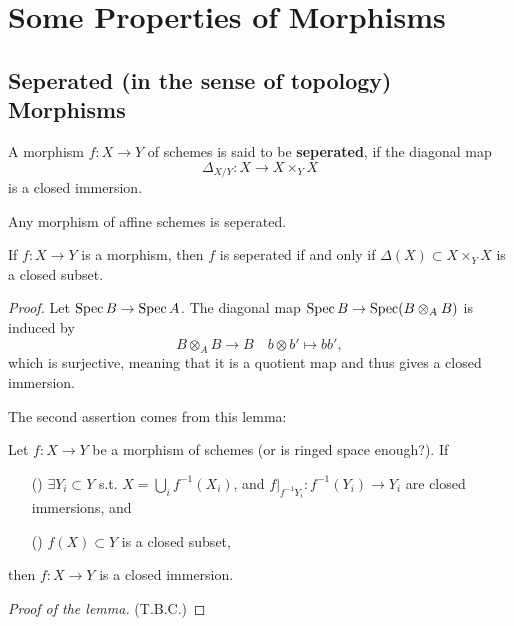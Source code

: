 \section{Some Properties of Morphisms}

\subsection{Seperated (in the sense of topology) Morphisms}
A morphism $f : X\to Y$ of schemes is said to be
\textbf{seperated}, if the diagonal map \[\Delta_{X/Y} : X\to X\times_Y X\]
is a closed immersion.
\begin{proposition}
    Any morphism of affine schemes is seperated.

    If $f : X\to Y$ is a morphism, then $f$ is seperated if and only if $\Delta(X)\subset X\times_YX$ is a closed subset.
\end{proposition}
\begin{proof}
    Let $\operatorname{Spec} B\to \operatorname{Spec} A$.
    The diagonal map $\operatorname{Spec} B\to \operatorname{Spec} (B\otimes_A B)$
    is induced by
    \[B\otimes_A B\to B\quad b\otimes b'\mapsto bb',\]
    which is surjective,
    meaning that it is a quotient map and thus gives a closed immersion.

    The second assertion comes from this lemma:
    \begin{lemma}\label{closed immersion iff 1.locally closed immersion 2.image closed}
        Let $f : X\to Y$ be a morphism of schemes (or is ringed space enough?).
        If\begin{enumerate}
        \item [(\rmnum{1})] $\exists Y_i\subset Y$ s.t. $X = \bigcup_{i}f^{-1}(X_i)$, and $f|_{f^{-1}Y_i} : f^{-1}(Y_i)\to Y_i$ are closed immersions, and
        \item [(\rmnum{2})] $f(X)\subset Y$ is a closed subset,
        \end{enumerate}
        then $f : X\to Y$ is a closed immersion.
    \end{lemma}
    \noindent\textit{Proof of the lemma.}
    (T.B.C.)
\end{proof}

